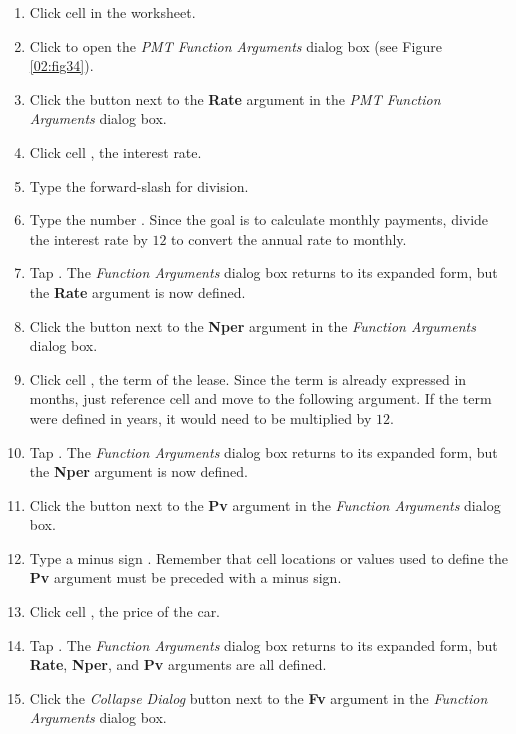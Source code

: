 \begin{enumbox}
	\begin{enumerate}
		\item Click cell  in the  worksheet.
		\item Click  to open the \textit{PMT Function Arguments} dialog box (see Figure \ref{02:fig34}).
		\item Click the  button next to the \textbf{Rate} argument in the \textit{PMT Function Arguments} dialog box.
		\item Click cell , the interest rate.
		\item Type the forward-slash \fmtTyping{/} for division.
		\item Type the number . Since the goal is to calculate monthly payments, divide the interest rate by $ 12 $ to convert the annual rate to monthly.
		\item Tap . The \textit{Function Arguments} dialog box returns to its expanded form, but the \textbf{Rate} argument is now defined.
		\item Click the  button next to the \textbf{Nper} argument in the \textit{Function Arguments} dialog box.
		\item Click cell , the term of the lease. Since the term is already expressed in months, just reference cell  and move to the following argument. If the term were defined in years, it would need to be multiplied by $ 12 $.
		\item Tap . The \textit{Function Arguments} dialog box returns to its expanded form, but the \textbf{Nper} argument is now defined.
		\item Click the  button next to the \textbf{Pv} argument in the \textit{Function Arguments} dialog box.
		\item Type a minus sign \fmtTyping{-}. Remember that cell locations or values used to define the \textbf{Pv} argument must be preceded with a minus sign.
		\item Click cell , the price of the car.
		\item Tap . The \textit{Function Arguments} dialog box returns to its expanded form, but \textbf{Rate}, \textbf{Nper}, and \textbf{Pv} arguments are all defined.
		\item Click the \textit{Collapse Dialog} button next to the \textbf{Fv} argument in the \textit{Function Arguments} dialog box.

\end{enumerate}
\end{enumbox}
